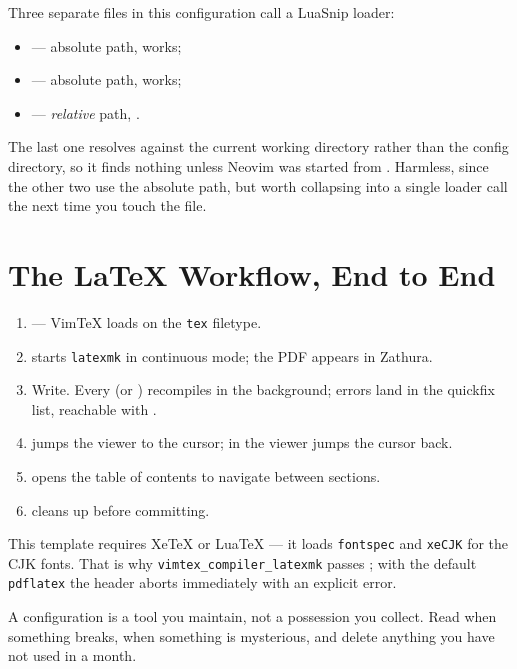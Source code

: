 \begin{remark}
	Three separate files in this configuration call a LuaSnip loader:
	\begin{itemize}[nosep, leftmargin=*]
		\item {} --- absolute path, works;
		\item {} --- absolute path, works;
		\item {} --- \emph{relative} path,
		      .
	\end{itemize}
	The last one resolves against the current working directory rather than the
	config directory, so it finds nothing unless Neovim was started from
	. Harmless, since the other two use the
	absolute path, but worth collapsing into a single loader call the next time you
	touch the file.
\end{remark}

\section{The \texorpdfstring{\LaTeX{}}{LaTeX} Workflow, End to End}

\begin{enumerate}[(1)]
	\item {} --- VimTeX loads on the \texttt{tex} filetype.
	\item \key{\textbackslash}   starts \texttt{latexmk} in continuous
	      mode; the PDF appears in Zathura.
	\item Write. Every  (or ) recompiles in the background;
	      errors land in the quickfix list, reachable with \key{]} .
	\item \key{\textbackslash}   jumps the viewer to the cursor;
	       in the viewer jumps the cursor back.
	\item \key{\textbackslash}   opens the table of contents to
	      navigate between sections.
	\item \key{\textbackslash}   cleans up before committing.
\end{enumerate}

\begin{note}
	This template requires XeTeX or LuaTeX --- it loads \texttt{fontspec} and
	\texttt{xeCJK} for the CJK fonts. That is why \texttt{vimtex\_compiler\_latexmk}
	passes ; with the default \texttt{pdflatex} the header aborts
	immediately with an explicit error.
\end{note}

\begin{moral}
	A configuration is a tool you maintain, not a possession you collect. Read
	 when something breaks,  when something is
	mysterious, and delete anything you have not used in a month.
\end{moral}
